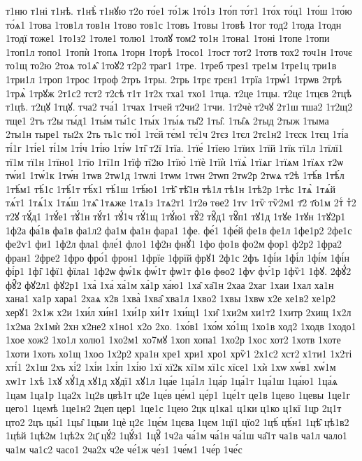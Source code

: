 {т1ню
т1ні
т1нѣ.
т1нѣ̀
т1нꙋю
т2о
то́е1
то́1ж
1то́1з
1то́п
то́т1
1то́х
то́ц1
1то́ш
1то́ю
то́ѧ1
1това
1тов1л
тов1н
1тово
тов1с
1товъ
1товы
1товѣ
1тог
тод2
1тода
1тодн
1тодї
тоже1
1то1з2
1толе1
толю1
1толꙋ
том2
то1н
1тона1
1тоні
1топе
1топи
1топ1л
топо1
1топѝ
1топѧ
1торн
1торѣ
1тосо1
1тост
тот2
1тотв
тох2
точ1н
1точє
то1щ
то2ю
2тоѧ
то1ѧ̑
1тоꙋ2
т2р2
траг1
1тре.
1треб
трез1
тре1м
1тре1ц
три1в
1три1л
1троп
1трос
1троф
2тръ
1тры.
2трь
1трє
трєн1
1трїа
1трѡ́1
1трѡв
2трѣ
1трѧ̀
1трꙋж
2т1с2
тст2
т2сѣ
т1т
1т2х
тха1
тхо1
1тца.
т2це
1тцы.
т2цє
1тцєв
2тцѣ
т1цѣ.
т2цꙋ
1тцꙋ.
тча2
тча́1
1тчах
1тчей
т2чи2
1тчи.
1т2чѐ
т2чꙋ
2т1ш
тша2
1т2щ2
тще1
2тъ
т2ы
ты́д1
1ты́м
ты́1с
1ты́х
1ты́ѧ
ты̑2
1ты̑.
1ты̑ѧ
2тыд
2тыж
1тыма
2ты1н
тыре1
ты2х
2ть
ть1с
тю́1
1тє́й
тє́м1
тє́1ч
2тєз
1тєл
2тє1н2
1тєск
1тєц
1ті́а
ті́1г
1ті́е1
ті́1м
1ті́ч
1ті́ю
1ті́ѡ
1ті̑
т2ї
1тїа.
1тїе́
1тїею
1тїих
1тїй
1тїк
тї1л
1тїлї1
тї1м
тї1н
1тїно1
1тїо
1тї1п
1тїф
тї2ю
1тїю̀
1тїѐ
1тїѝ
1тїѧ̀
1тїѧг
1тїѧм
1тїѧх
т2ѡ
тѡ́и1
1тѡ́1к
1тѡ́н
1тѡв
2тѡ1д
1тѡлі
1тѡм
1тѡн
2тѡп
2тѡ2р
2тѡѧ
т2ѣ
1тѣ́в
1тѣ́л
1тѣ́м1
тѣ́1с
1тѣ́1т
тѣ́х1
тѣ́1ш
1тѣ́ю1
1тѣ̑
тѣ̑1н
тѣ1л
тѣ1н
1тѣ2р
1тѣс
1тѧ̀
1тѧ́й
тѧ́т1
1тѧ́1х
1тѧ́ш
1тѧ̑
1тѧже
1тѧ1з
1тѧ2т1
1т2ѳ
тѳе2
1тѵ
1тѷ
тѷ2м1
т҃2
т҃о1м
2тⷭ
тⷯ2
т2ꙋ
тꙋ́д1
1тꙋ́е1
тꙋ́1н
тꙋ́т1
тꙋ́1ч
тꙋ́1щ
1тꙋ́ю1
тꙋ̑2
тꙋ̑д1
тꙋ̑п1
тꙋ1д
1тꙋе
1тꙋн
1тꙋ2р1
1ф2а
фа́1в
фа1в
фа1л2
фа1м
фа1н
фара1
1фе.
фе́1
1фе́й
фе1в
фе1л
1фе1р2
2фе1с
фе2ѵ1
фи1
1ф2л
фла1
фле́1
фло1
1ф2н
фнꙋ́1
1фо
фо1в
фо2м
фор1
ф2р2
1фра2
фран1
2фре2
1фро
фро́1
фрон1
1фрїе
1фрїй
фрꙋ1
2ф1с
2фъ
1фі́и
1фі́л
1фі́м
1фі́н
фі́р1
1фі̑
1фї1
фїла1
1ф2ѡ
фѡ́1к
фѡ́1т
фѡ1т
ф1ѳ
фѳо2
1фѵ
фѵ́1р
1фѷ1
1фꙋ.
2фꙋ́2
фꙋ̑2
фꙋ2л1
фꙋ2р1
1ха̀
1ха́
ха́1м
ха́1р
ха́ю1
1ха̑
ха̑1н
2хаа
2хаг
1хаи
1хал
ха1н
хана1
ха1р
хара1
2хаѧ
х2в
1хва̀
1хва̑
хва1л
1хво2
1хвы
1хвѡ
х2е
хе1в2
хе1р2
херꙋ1
2х1ж
х2и
1хи́л
хи́н1
1хи́1р
хи́1т
1хи́щ1
1хи̑
1хи2м
хи1т2
1хитр
2хищ
1х2л
1х2ма
2х1мѝ
2хн
х2не2
х1но1
х2о
2хо.
1хо́в1
1хо́м
хо́1щ
1хо1в
ход2
1ходв
1ходо1
1хое
хож2
1хо1л
холю1
1хо2м1
хо7мꙋ
1хоп
хопа1
1хо2р
1хос
хот2
1хотв
1хоте
1хоти
1хоть
хо1щ
1хоѻ
1х2р2
хра1н
хре1
хри1
хро1
хрѷ1
2х1с2
хст2
х1ти1
1х2ті
хті́1
2х1ш
2хъ
хі́2
1хі́и
1хі́п
1хі́ю
1хї
хї2к
хї1м
хї1с
хїсе1
1хѝ
1хѡ
хѡ́в1
хѡ́1м
хѡ1т
1хѣ
1хꙋ
хꙋ́1д
хꙋ1д
хꙋдї1
хꙋ1л
1ца́е
1ца́1л
1ца́р
1ца́1т
1ца́1ш
1ца́ю1
1ца́ѧ
1цам
1ца1р
1ца2х
1ц2в
цвѣ1т
ц2е
1це́в
це́м1
це́р1
1це́1т
це1в
1цево
1цевы
1це1г
цего1
1цемѣ
1це1н2
2цеп
цер1
1це1с
1цею
2цк
ц1ка1
ц1ки
ц1ко
ц1кї
1цр
2ц1т
цто2
2цъ
цы́1
1цы̑
1цыи
1цѐ
ц2є
1цє́м
1цєва
1цєм
1цї1
цїо2
1цѣ́
цѣ́н1
1цѣ̑
цѣ1в2
1цѣй
1цѣ2м
1цѣ2х
2ц҃
цꙋ́2
1цꙋ́з1
1цꙋ̑
1ч2а
ча́1м
ча́1н
ча́1ш
ча̑1т
ча1в
ча1л
чало1
ча1м
ча1с2
часо1
2ча2х
ч2е
че́1ж
че́з1
1че́м1
1че́р
1че́с
}
